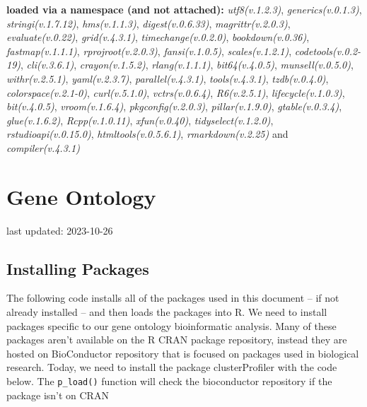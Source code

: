 \documentclass[
]{book}
\begin{document}
\textbf{loaded via a namespace (and not attached):}
\emph{utf8(v.1.2.3)}, \emph{generics(v.0.1.3)}, \emph{stringi(v.1.7.12)}, \emph{hms(v.1.1.3)}, \emph{digest(v.0.6.33)}, \emph{magrittr(v.2.0.3)}, \emph{evaluate(v.0.22)}, \emph{grid(v.4.3.1)}, \emph{timechange(v.0.2.0)}, \emph{bookdown(v.0.36)}, \emph{fastmap(v.1.1.1)}, \emph{rprojroot(v.2.0.3)}, \emph{fansi(v.1.0.5)}, \emph{scales(v.1.2.1)}, \emph{codetools(v.0.2-19)}, \emph{cli(v.3.6.1)}, \emph{crayon(v.1.5.2)}, \emph{rlang(v.1.1.1)}, \emph{bit64(v.4.0.5)}, \emph{munsell(v.0.5.0)}, \emph{withr(v.2.5.1)}, \emph{yaml(v.2.3.7)}, \emph{parallel(v.4.3.1)}, \emph{tools(v.4.3.1)}, \emph{tzdb(v.0.4.0)}, \emph{colorspace(v.2.1-0)}, \emph{curl(v.5.1.0)}, \emph{vctrs(v.0.6.4)}, \emph{R6(v.2.5.1)}, \emph{lifecycle(v.1.0.3)}, \emph{bit(v.4.0.5)}, \emph{vroom(v.1.6.4)}, \emph{pkgconfig(v.2.0.3)}, \emph{pillar(v.1.9.0)}, \emph{gtable(v.0.3.4)}, \emph{glue(v.1.6.2)}, \emph{Rcpp(v.1.0.11)}, \emph{xfun(v.0.40)}, \emph{tidyselect(v.1.2.0)}, \emph{rstudioapi(v.0.15.0)}, \emph{htmltools(v.0.5.6.1)}, \emph{rmarkdown(v.2.25)} and \emph{compiler(v.4.3.1)}

\hypertarget{gene-ontology}{%
\chapter{Gene Ontology}\label{gene-ontology}}

last updated: 2023-10-26

\hypertarget{installing-packages-1}{%
\section{Installing Packages}\label{installing-packages-1}}

The following code installs all of the packages used in this document -- if not already installed -- and then loads the packages into R. We need to install packages specific to our gene ontology bioinformatic analysis. Many of these packages aren't available on the R CRAN package repository, instead they are hosted on BioConductor repository that is focused on packages used in biological research. Today, we need to install the package clusterProfiler with the code below. The \texttt{p\_load()} function will check the bioconductor repository if the package isn't on CRAN
\end{document}
